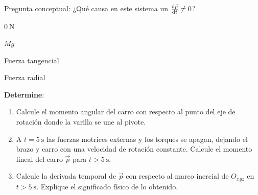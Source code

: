 \documentclass[11pt, spanish, a4paper, twoside]{article}
\begin{document}
\begin{enumerate}
Pregunta conceptual:
¿Qué causa en este sistema un $\dv{\vec{p}}{t} \neq 0$?\\
\begin{enumerate*}[label=\alph*),itemjoin={,\quad}]
	\item $\SI{0}{\newton}$
	\item $M g$
	\item Fuerza tangencial
	\item Fuerza radial
\end{enumerate*}

\textbf{Determine}:
\begin{enumerate}[label=\alph*)]
	\item Calcule el momento angular del carro con respecto al punto del eje de rotación donde la varilla se une al pivote.
	\item A $t= \SI{5}{\second}$ las fuerzas motrices externas y los torques se apagan, dejando el brazo y carro con una velocidad de rotación constante.
	Calcule el momento lineal del carro $\vec{p}$ para $t>\SI{5}{\second}$.
	\item Calcule la derivada temporal de $\vec{p}$ con respecto al marco inercial de $O_{xyz}$ en $t> \SI{5}{\second}$.
	Explique el significado físico de lo obtenido.
\end{enumerate}


\end{enumerate}
\end{document}
